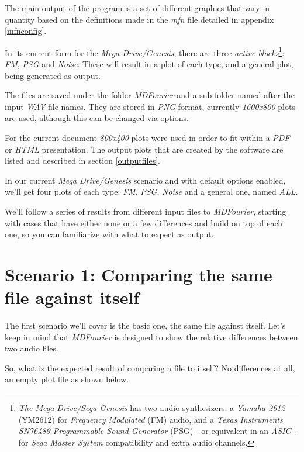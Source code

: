 \documentclass[10pt,a4paper]{report}
\begin{document}
The main output of the program is a set of different graphics that vary in quantity based on the definitions made in the \textit{mfn} file detailed in appendix \ref{mfnconfig}.

In its current form for the \textit{Mega Drive/Genesis}, there are three \textit{active blocks}\footnote{\textit{The Mega Drive/Sega Genesis} has two audio synthesizers: a \textit{Yamaha 2612} (YM2612) for \textit{Frequency Modulated} (FM) audio, and a \textit{Texas Instruments SN76489 Programmable Sound Generator} (PSG)  - or equivalent in an \textit{ASIC} - for \textit{Sega Master System} compatibility and extra audio channels. }: \textit{FM}, \textit{PSG} and \textit{Noise}. These will result in a plot of each type, and a general plot, being generated as output.

The files are saved under the folder \textit{MDFourier} and a sub-folder named after the input \textit{WAV} file names. They are stored in \textit{PNG} format, currently \textit{1600x800} plots are used, although this can be changed via options. 

For the current document \textit{800x400} plots were used in order to fit within a \textit{PDF} or \textit{HTML} presentation. The output plots that are created by the software are listed and described in section \ref{outputfiles}.

In our current \textit{Mega Drive/Genesis} scenario and with default options enabled, we'll get four plots of each type: \textit{FM}, \textit{PSG}, \textit{Noise} and a general one, named \textit{ALL}.

We'll follow a series of results from different input files to \textit{MDFourier}, starting with cases that have either none or a few differences and build on top of each one, so you can familiarize with what to expect as output.

\section{Scenario 1: Comparing the same file against itself}

The first scenario we'll cover is the basic one, the same file against itself. Let's keep in mind that \textit{MDFourier} is designed to show the relative differences between two audio files.

So, what is the expected result of comparing a file to itself? No differences at all, an empty plot file as shown below.
\end{document}
